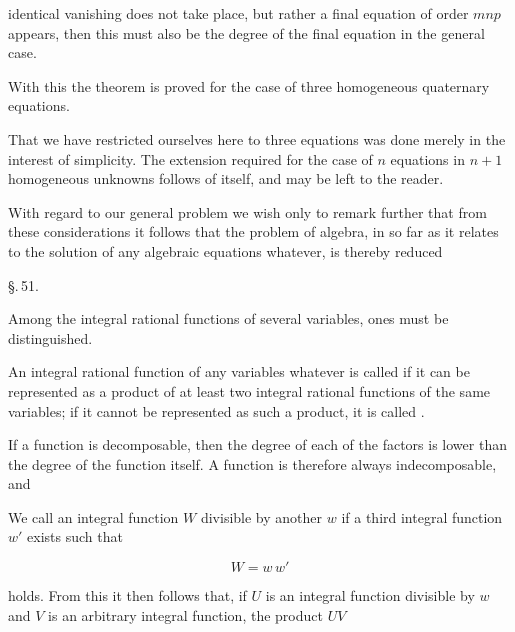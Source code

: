 identical vanishing does not take place, but rather a final equation of order $mnp$ appears, then this must also be the
degree of the final equation in the general case.

With this the  theorem is proved for the case of
three homogeneous quaternary equations.

That we have restricted ourselves here to three equations
was done merely in the interest of simplicity. The extension required for the case of $n$ equations in $n + 1$ homogeneous unknowns follows of itself, and
may be left to the reader.

With regard to our general problem we wish only to remark further that from these considerations it follows that the
problem of algebra, in so far as it relates to the solution of any
algebraic equations whatever, is thereby reduced

\begin{center}
\S.\,51.

\end{center}

Among the integral rational functions of several variables,  ones must be
distinguished.

An integral rational function of any variables whatever is called  if it can be represented as a product of at least
two integral rational functions of the same variables; if it cannot be represented as such a product,
it is called .

If a function is decomposable, then the degree of each
of the factors is lower than the degree of the function itself. A
 function is therefore always indecomposable, and 

We call an integral function $W$ divisible by another $w$
if a third integral function $w'$ exists such that

\[
W = w\,w'
\]

holds. From this it then follows that, if $U$ is an integral function divisible by $w$
and $V$ is an arbitrary integral function, the product $UV$
